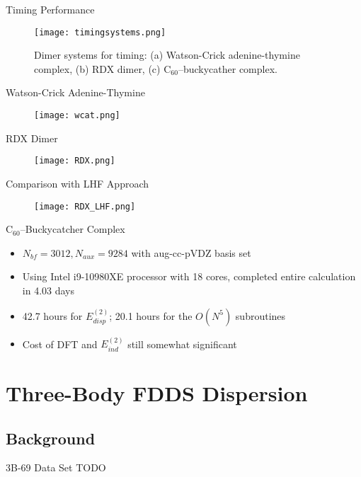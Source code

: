 \documentclass{beamer}
\begin{document}
        \begin{frame}{Timing Performance}
            \begin{figure}
                \centering
                \texttt{[image: timingsystems.png]}
                \caption{Dimer systems for timing: (a) Watson-Crick adenine-thymine complex, (b) RDX dimer, (c) C$_{60}$--buckycather complex.}
            \end{figure}
        \end{frame}

        \begin{frame}{Watson-Crick Adenine-Thymine}
            \begin{figure}
                \centering
                \texttt{[image: wcat.png]}
            \end{figure}
        \end{frame}

        \begin{frame}{RDX Dimer}
            \begin{figure}
                \centering
                \texttt{[image: RDX.png]}
            \end{figure}
        \end{frame}

        \begin{frame}{Comparison with LHF Approach}
            \begin{figure}
                \centering
                \texttt{[image: RDX\_LHF.png]}
            \end{figure}
        \end{frame}

        \begin{frame}{C$_{60}$--Buckycatcher Complex}
            \begin{itemize}
                \item $N_{bf} = 3012, N_{aux} = 9284$ with aug-cc-pVDZ basis set
                \item Using Intel i9-10980XE processor with 18 cores, completed entire calculation in 4.03 days
                \item 42.7 hours for $E_{disp}^{(2)}$; 20.1 hours for the $O(N^5)$ subroutines
                \item Cost of DFT and $E_{ind}^{(2)}$ still somewhat significant
            \end{itemize}
        \end{frame}

\section{Three-Body FDDS Dispersion}

    \subsection{Background}
    
        \begin{frame}{3B-69 Data Set}
           TODO
        \end{frame}
\end{document}
